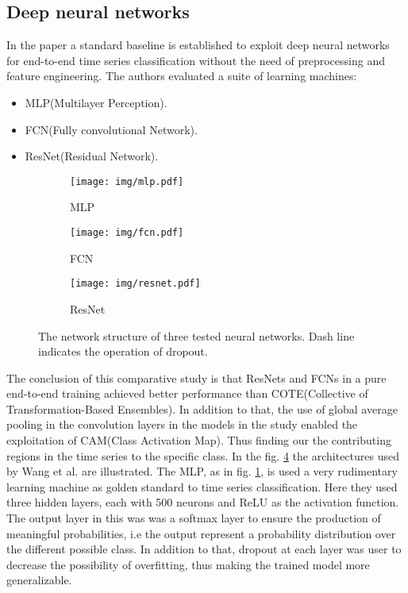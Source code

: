 \subsection{Deep neural networks}
In the paper \cite{yang2019time} a standard baseline is established to exploit deep neural networks for end-to-end time series classification without the need of preprocessing and feature engineering. The authors evaluated a suite of learning machines:
\begin{itemize}
	\item MLP(Multilayer Perception).
	\item FCN(Fully convolutional Network).
	\item ResNet(Residual Network).
\end{itemize}
\begin{figure}
	\centering
	\begin{subfigure}[b]{0.25\textwidth}
		\centering
		\texttt{[image: img/mlp.pdf]}
		\caption{MLP}
		\label{fig:wang2017timemlp}
	\end{subfigure}
	\hfill
	\begin{subfigure}[b]{0.25\textwidth}
		\centering
		\texttt{[image: img/fcn.pdf]}
		\caption{FCN}
		\label{fig:wang2017timefcn}
	\end{subfigure}
	\hfill
	\begin{subfigure}[b]{0.3\textwidth}
		\centering
		\texttt{[image: img/resnet.pdf]}
		\caption{ResNet}
		\label{fig:wang2017timeresnet}
	\end{subfigure}
	\caption{The network structure of three tested neural networks. Dash line indicates the operation of dropout\cite{wang2017time}.}
	\label{fig:wang2017time}
\end{figure}
The conclusion of this comparative study is that ResNets and FCNs in a pure end-to-end training achieved better performance than COTE(Collective of \\Transformation-Based Ensembles)\cite{2015TSClassificationCOTE}. In addition to that, the use of global average pooling in the convolution layers in the models in the study enabled the exploitation of CAM(Class Activation Map). Thus finding our the contributing regions in the time series to the specific class\cite{wang2017time}. In the fig. \ref{fig:wang2017time} the architectures used by Wang et al. are illustrated.\newline
The MLP, as in fig. \ref{fig:wang2017timemlp}, is used a very rudimentary learning machine as golden standard to time series classification. Here they used three hidden layers, each with 500 neurons and ReLU as the activation function. The output layer in this was was a softmax layer to ensure the production of meaningful probabilities, i.e the output represent a probability distribution over the different possible class\cite{wang2017time}. In addition to that, dropout at each layer was user to decrease the possibility of overfitting, thus making the trained model more generalizable.\newline
